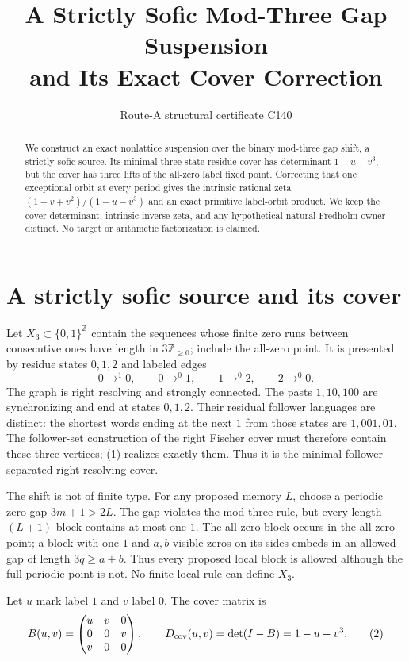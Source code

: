 \documentclass[10pt]{article}
\title{A Strictly Sofic Mod-Three Gap Suspension\\
and Its Exact Cover Correction}
\author{Route-A structural certificate C140}
\date{}
\begin{document}
\maketitle

\begin{abstract}
We construct an exact nonlattice suspension over the binary mod-three gap
shift, a strictly sofic source.  Its minimal three-state residue cover has
determinant $1-u-v^3$, but the cover has three lifts of the all-zero label
fixed point.  Correcting that one exceptional orbit at every period gives the
intrinsic rational zeta $(1+v+v^2)/(1-u-v^3)$ and an exact primitive
label-orbit product.  We keep the cover determinant, intrinsic inverse zeta,
and any hypothetical natural Fredholm owner distinct.  No target or arithmetic
factorization is claimed.
\end{abstract}

\section{A strictly sofic source and its cover}
Let $X_3\subset\{0,1\}^{\mathbb Z}$ contain the sequences whose finite zero
runs between consecutive ones have length in $3\mathbb Z_{\geq0}$; include the
all-zero point.  It is presented by residue states $0,1,2$ and labeled edges
\[
0\mathop{\longrightarrow}^{1}0,\qquad
0\mathop{\longrightarrow}^{0}1,\qquad
1\mathop{\longrightarrow}^{0}2,\qquad
2\mathop{\longrightarrow}^{0}0.                  \tag{1}
\]
The graph is right resolving and strongly connected.  The pasts $1,10,100$
are synchronizing and end at states $0,1,2$.  Their residual follower
languages are distinct: the shortest words ending at the next $1$ from those
states are $1,001,01$.  The follower-set construction of the right Fischer
cover must therefore contain these three vertices; (1) realizes exactly them.
Thus it is the minimal follower-separated right-resolving cover.

The shift is not of finite type.  For any proposed memory $L$, choose a
periodic zero gap $3m+1>2L$.  The gap violates the mod-three rule, but every
length-$(L+1)$ block contains at most one $1$.  The all-zero block occurs in
the all-zero point; a block with one $1$ and $a,b$ visible zeros on its sides
embeds in an allowed gap of length $3q\geq a+b$.  Thus every proposed local
block is allowed although the full periodic point is not.  No finite local
rule can define $X_3$.

Let $u$ mark label $1$ and $v$ label $0$.  The cover matrix is
\begin{equation}
B(u,v)=\begin{pmatrix}u&v&0\\0&0&v\\v&0&0\end{pmatrix},\qquad
D_{\rm cov}(u,v)=\det(I-B)=1-u-v^3.               \tag{2}
\end{equation}
\end{document}
